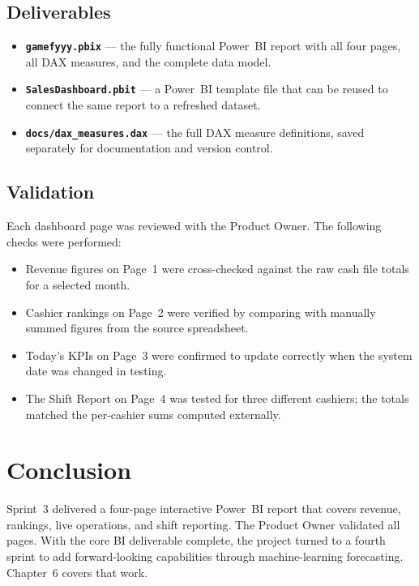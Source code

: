 \subsection{Deliverables}

\begin{itemize}
  \item \textbf{\texttt{gamefyyy.pbix}} — the fully functional Power~BI report with
        all four pages, all DAX measures, and the complete data model.
  \item \textbf{\texttt{SalesDashboard.pbit}} — a Power~BI template file that can
        be reused to connect the same report to a refreshed dataset.
  \item \textbf{\texttt{docs/dax\_measures.dax}} — the full DAX measure definitions,
        saved separately for documentation and version control.
\end{itemize}

\subsection{Validation}

Each dashboard page was reviewed with the Product Owner. The following checks were
performed:

\begin{itemize}[noitemsep]
  \item Revenue figures on Page~1 were cross-checked against the raw cash file
        totals for a selected month.
  \item Cashier rankings on Page~2 were verified by comparing with manually
        summed figures from the source spreadsheet.
  \item Today's KPIs on Page~3 were confirmed to update correctly when the
        system date was changed in testing.
  \item The Shift Report on Page~4 was tested for three different cashiers; the
        totals matched the per-cashier sums computed externally.
\end{itemize}

\section{Conclusion}

Sprint~3 delivered a four-page interactive Power~BI report that covers revenue,
rankings, live operations, and shift reporting. The Product Owner validated all
pages. With the core BI deliverable complete, the project turned to a fourth sprint
to add forward-looking capabilities through machine-learning forecasting. Chapter~6
covers that work.

